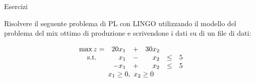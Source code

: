 \documentclass{beamer}
\begin{document}
\generatitolo


\begin{frame}%
{Esercizi}

Risolvere il seguente problema di PL con LINGO
utilizzando il modello del problema del mix ottimo
di produzione e scrivendone i dati su di un file
di dati:

\begin{enumerate}
{\footnotesize \item
$$\begin{array}{crrrcr}
\max z=& 20 x_1 &+& 30 x_2\\
{\rm s.t.} &  x_1 &-&  x_2 & \leq & 5 \\
           &- x_1 &+&  x_2 & \leq & 5  \\
           \multicolumn{6}{c}{x_1 \geq 0,\ x_2 \geq 0}
\end{array}%
$$%
}
\end{enumerate}


\end{frame}
\end{document}
